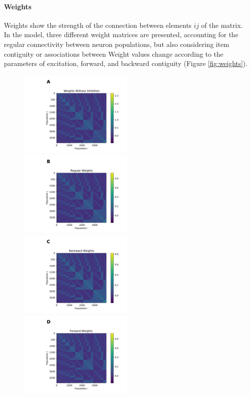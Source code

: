     \paragraph{Weights}

    Weights show the strength of the connection between elements \(i j\) of the matrix.
    In the model, three different weight matrices are presented, accounting for the regular connectivity between neuron populations, but also considering item contiguity or associations between
    Weight values change according to the parameters of excitation, forward, and backward contiguity (Figure \ref{fig:weights}).
        
    \begin{figure}
        \includegraphics[width=0.5\textwidth]{graphics/weights_without_inhibition.pdf}
        \includegraphics[width=0.5\textwidth]{graphics/weights_reg.pdf}
        \includegraphics[width=0.5\textwidth]{graphics/weights_back.pdf}
        \includegraphics[width=0.5\textwidth]{graphics/weights_forth.pdf}

\end{figure}
